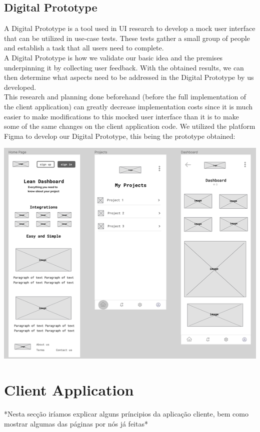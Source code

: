 \documentclass[a4paper,twoside,10pt]{report}
\begin{document}
\section{Digital Prototype}
A Digital Prototype is a tool used in UI research to develop a mock user interface that can be utilized in use-case tests. These tests gather a small group of people and establish a task that all users need to complete. 
\\ \newline
A Digital Prototype is how we validate our basic idea and the premises underpinning it by collecting user feedback.
With the obtained results, we can then determine what aspects need to be addressed in the Digital Prototype by us developed.
\\ \newline
This research and planning done beforehand (before the full implementation of the client application) can greatly decrease implementation costs since it is much easier to make modifications to this mocked user interface than it is to make some of the same changes on the client application code.
We utilized the platform Figma\cite{FIGMA} to develop our Digital Prototype, this being the prototype obtained:
\\ \newline
\begin{center}
    \includegraphics[width=\textwidth]{digital-prototype.png}
\end{center}

\chapter{Client Application}
*Nesta secção iríamos explicar alguns príncipios da aplicação cliente, bem como mostrar algumas das páginas por nós já feitas*
\end{document}
